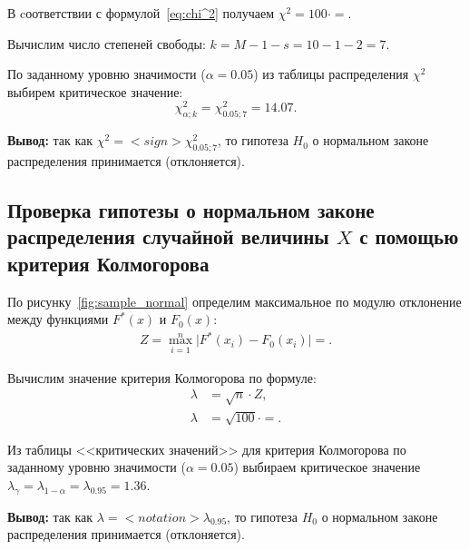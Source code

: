 \documentclass[14pt,hidelinks]{extarticle}
\begin{document}
В cоответствии с формулой~\eqref{eq:chi^2} получаем $\chi^2= 100 \cdot  =  $.

Вычислим число степеней свободы: $ k = M - 1 - s = 10 - 1 - 2 = 7 $. 

По заданному уровню значимости ($\alpha = 0.05$) из таблицы распределения $\chi^2$ выбирем критическое значение:
\begin{equation*}
  \chi^2_{\alpha; k} = \chi^2_{0.05; 7} = 14.07.
\end{equation*}

\textbf{Вывод:} так как $\chi^2 =  {<}sign{>} \chi^2_{0.05;7} $, то гипотеза $H_0$ о нормальном законе распределения принимается (отклоняется). 


\subsection{Проверка гипотезы о нормальном законе распределения 
  случайной величины $ X $ с помощью критерия Колмогорова}

По рисунку~\ref{fig:sample_normal} определим максимальное по модулю отклонение между функциями $F^*(x)$ и $F_0(x)$:
\begin{align}
	Z = \max_{i=1}^n \Big| F^*(x_i) - F_0(x_i) \Big| = .
\end{align}

Вычислим значение критерия Колмогорова по формуле:
\begin{align}
  \lambda &= \sqrt{n} \cdot Z, \\ \nonumber
  \lambda &= \sqrt{100} \cdot  = .
\end{align}

Из таблицы <<критических значений>> для критерия Колмогорова по заданному уровню значимости ($\alpha = 0.05$)
выбираем критическое значение $\lambda_{\gamma} = \lambda_{1-\alpha} = \lambda_{0.95} = 1.36 $.

\textbf{Вывод:} так как $\lambda =  {<}notation{>} \lambda_{0.95} $, то гипотеза $H_0$ о нормальном законе распределения принимается (отклоняется).
\end{document}
